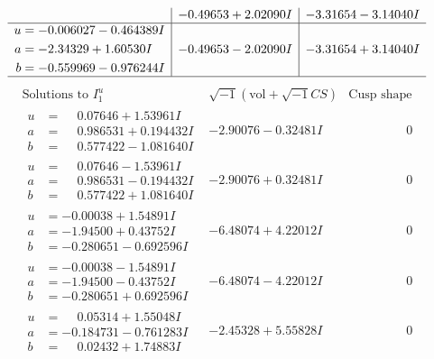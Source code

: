 \documentclass[1p]{elsarticle_modified}
\theoremstyle{definition}
\newcommand{\I}{\sqrt{-1}}
\begin{document}
$$\begin{array}{c|c|c}
 & -0.49653 + 2.02090 I & -3.31654 - 3.14040 I \\ \hline\begin{aligned}
u &= -0.006027 - 0.464389 I \\
a &= -2.34329 + 1.60530 I \\
b &= -0.559969 - 0.976244 I\end{aligned}
 & -0.49653 - 2.02090 I & -3.31654 + 3.14040 I\\
 \hline 
 \end{array}$$\newpage$$\begin{array}{c|c|c}  
\text{Solutions to }I^u_{1}& \I (\text{vol} + \sqrt{-1}CS) & \text{Cusp shape}\\
 \hline 
\begin{aligned}
u &= \phantom{-}0.07646 + 1.53961 I \\
a &= \phantom{-}0.986531 + 0.194432 I \\
b &= \phantom{-}0.577422 - 1.081640 I\end{aligned}
 & -2.90076 - 0.32481 I & \phantom{-0.000000 } 0 \\ \hline\begin{aligned}
u &= \phantom{-}0.07646 - 1.53961 I \\
a &= \phantom{-}0.986531 - 0.194432 I \\
b &= \phantom{-}0.577422 + 1.081640 I\end{aligned}
 & -2.90076 + 0.32481 I & \phantom{-0.000000 } 0 \\ \hline\begin{aligned}
u &= -0.00038 + 1.54891 I \\
a &= -1.94500 + 0.43752 I \\
b &= -0.280651 - 0.692596 I\end{aligned}
 & -6.48074 + 4.22012 I & \phantom{-0.000000 } 0 \\ \hline\begin{aligned}
u &= -0.00038 - 1.54891 I \\
a &= -1.94500 - 0.43752 I \\
b &= -0.280651 + 0.692596 I\end{aligned}
 & -6.48074 - 4.22012 I & \phantom{-0.000000 } 0 \\ \hline\begin{aligned}
u &= \phantom{-}0.05314 + 1.55048 I \\
a &= -0.184731 - 0.761283 I \\
b &= \phantom{-}0.02432 + 1.74883 I\end{aligned}
 & -2.45328 + 5.55828 I & \phantom{-0.000000 } 0 \\ \hline\begin{aligned}

\end{aligned}
\end{array}$$
\end{document}
